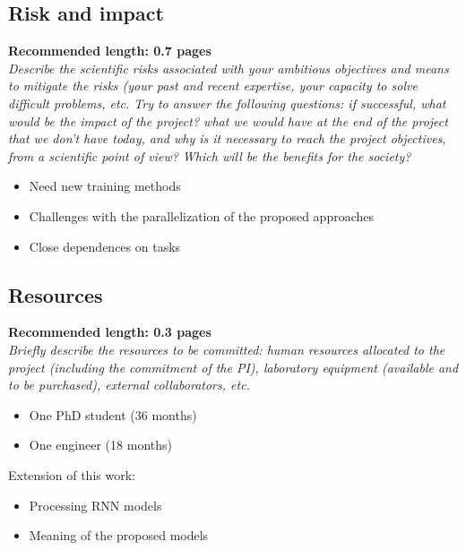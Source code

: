 
\subsection*{Risk and impact}
\textbf{Recommended length: 0.7 pages}\\

\textit{Describe the scientific risks associated with your ambitious objectives and means to mitigate the risks (your past and recent expertise, your capacity to solve difficult problems, etc. Try to answer the following questions: if successful, what would be the impact of the project? what we would have at the end of the project that we don't have today, and why is it necessary to reach the project objectives, from a scientific point of view? Which will be the benefits for the society?}

	\begin{itemize}
	\item Need new training methods
	\item Challenges with the parallelization of the proposed approaches
	\item Close dependences on tasks
\end{itemize}

\subsection*{Resources}
\textbf{Recommended length: 0.3 pages}\\

\textit{Briefly describe the resources to be committed: human resources allocated to the project (including the commitment of the PI), laboratory equipment (available and to be purchased), external collaborators, etc.}

\begin{itemize}
	\item One PhD student (36 months)
	\item One engineer (18 months)
\end{itemize}

Extension of this work:
\begin{itemize}
	\item Processing RNN models
	\item Meaning of the proposed models
\end{itemize}





